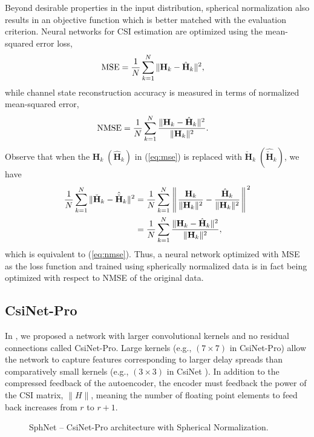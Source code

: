 Beyond desirable properties in the input distribution, spherical normalization also results in an objective function which is better matched with the evaluation criterion. Neural networks for CSI estimation are optimized using the mean-squared error loss,
\begin{align} 
	\text{MSE}&=\frac 1N \sum_{k=1}^N\Arrowvert\mathbf H_k - \hat{\mathbf H}_k\Arrowvert^2, \label{eq:mse}
\end{align}
while channel state reconstruction accuracy is measured in terms of normalized mean-squared error,
\begin{align} 
	\text{NMSE}&=\frac 1N \sum_{k=1}^N\frac{\Arrowvert\mathbf H_k - \hat{\mathbf H}_k\Arrowvert^2}{\Arrowvert\mathbf H_k\Arrowvert^2}. \label{eq:nmse}
\end{align}
Observe that when the $\mathbf H_k \; (\hat{\mathbf H}_k)$ in (\ref{eq:mse}) is replaced with $\check{\mathbf H}_k \; (\hat{\check{\mathbf H}}_k)$, we have
\begin{align*} 
	\frac 1N \sum_{k=1}^N\Arrowvert\check{\mathbf H}_k - \hat{\check{\mathbf H}}_k\Arrowvert^2&= \frac 1N \sum_{k=1}^N\left\Arrowvert \frac{\mathbf H_k}{\Arrowvert\mathbf H_k\Arrowvert^2} - \frac{\hat{\mathbf H}_k}{\Arrowvert\mathbf H_k\Arrowvert^2}\right\Arrowvert^2 \\
	&= \frac 1N \sum_{k=1}^N\frac{\Arrowvert\mathbf H_k - \hat{\mathbf H}_k\Arrowvert^2}{\Arrowvert\mathbf H_k\Arrowvert^2},
\end{align*}
which is equivalent to (\ref{eq:nmse}). Thus, a neural network optimized with MSE as the loss function and trained using spherically normalized data is in fact being optimized with respect to NMSE of the original data.

\subsection{CsiNet-Pro}
\label{sect:csinet_pro}

In \cite{ref:liu2020sphnet}, we proposed a network with larger convolutional kernels and no residual connections called CsiNet-Pro. Large kernels (e.g., $(7\times 7)$ in CsiNet-Pro) allow the network to capture features corresponding to larger delay spreads than comparatively small kernels (e.g., $(3\times 3)$ in CsiNet \cite{ref:csinet}). In addition to the compressed feedback of the autoencoder, the encoder must feedback the power of the CSI matrix, $\|H\|$, meaning the number of floating point elements to feed back increases from $r$ to $r+1$.
\begin{figure}[htb]
  \centering
  {
    \fontsize{6pt}{6pt}
    \def\svgwidth{1.0\columnwidth}
    
  }
  \caption{SphNet -- CsiNet-Pro architecture with Spherical Normalization.}
  \label{fig:sphnet-arch}
\end{figure}

